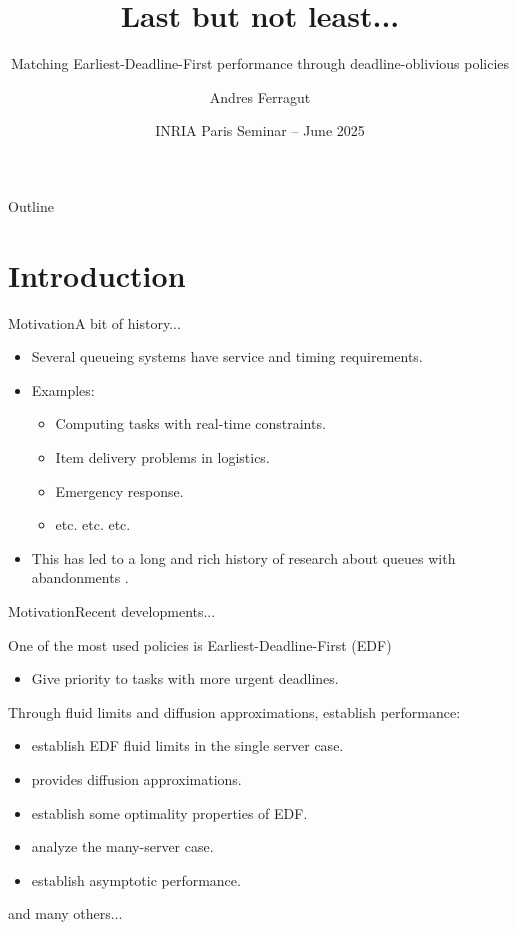 \documentclass[aspectratio=169]{beamer}
\title{Last but not least...}
\subtitle{Matching Earliest-Deadline-First performance through deadline-oblivious policies}
\author[Andres Ferragut, Universidad ORT Uruguay]{Andres Ferragut}
\institute{Universidad ORT Uruguay}
\date[INRIA Paris Seminar -- Jun 2025]{INRIA Paris Seminar -- June 2025}
\renewcommand{\cite}{\citep}
\newenvironment*{myitem}[1][1.5em]{\begin{itemize}\setlength{\itemsep}{#1}}{\end{itemize}}
\begin{document}
\frame[plain]{\titlepage}

\begin{frame}{Outline}
\tableofcontents
\end{frame}

\section{Introduction}

\begin{frame}{Motivation}{A bit of history...}

	\begin{myitem}
		\item Several queueing systems have service and \alert{timing} requirements.
		\item Examples:
		\begin{itemize}
			\item Computing tasks with real-time constraints.
			\item Item delivery problems in logistics.
			\item Emergency response.
			\item etc. etc. etc.
		\end{itemize}
		\item This has led to a long and rich history of research about \alert{queues with abandonments} \cite{barrer1957queuing,stanford1979reneging,baccellietal1984single}.
	\end{myitem}

\end{frame}

\begin{frame}{Motivation}{Recent developments...}

	One of the most used policies is \alert{Earliest-Deadline-First (EDF)}
	\begin{itemize}
		\item Give priority to tasks with more urgent deadlines.
	\end{itemize}
	\vfill
	\pause
	
	Through fluid limits and diffusion approximations, establish performance:
	\begin{itemize}
		\item \cite{decreusefondmoyal2005fluid} establish EDF fluid limits in the single server case.
		\item \cite{kruketal2011heavy} provides diffusion approximations.
		\item \cite{moyal2013queues} establish some optimality properties of EDF.
		\item \cite{kangramanan2010fluid, kangramanan2012asymptotic} analyze the many-server case.
		\item \cite{ataretal2018law,ataretal2023long} establish asymptotic performance.
	\end{itemize}
	\vfill
	and many others...
\end{frame}
\end{document}
